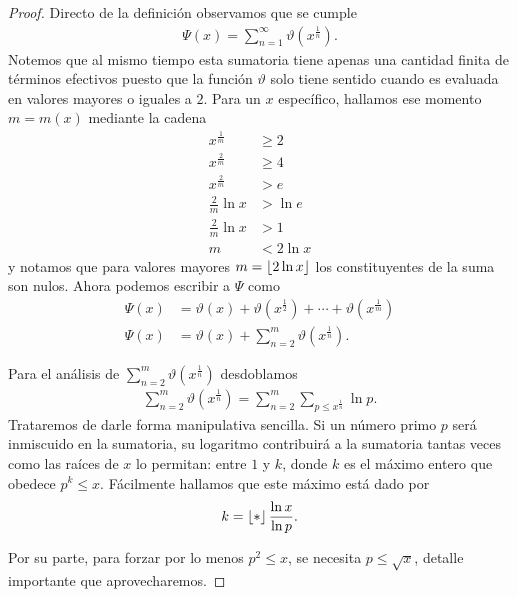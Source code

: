 \begin{proof}
Directo de la definici\'on observamos que se cumple 
\begin{align}
\Psi(x) = \sum_{n = 1}^\infty \vartheta(x^\frac{1}{n}).
\end{align}
Notemos que al mismo tiempo esta sumatoria tiene apenas una cantidad finita de t\'erminos efectivos puesto que la funci\'on $\vartheta$ 
solo tiene sentido cuando es evaluada en valores mayores o iguales a $2$. 
Para un $x$ espec\'ifico,  hallamos ese momento $m=m(x)$ mediante la cadena 
\begin{align}
x^\frac{1}{m} &\geq 2 \\
x^\frac{2}{m} &\geq 4 \\
x^\frac{2}{m} &> e \\
\frac{2}{m}\ln x &> \ln e \\
\frac{2}{m}\ln x &> 1 \\
m &< 2 \ln x
\end{align}
y notamos que para valores mayores $m = \left\lfloor 2 \ln x \right\rfloor$ los constituyentes de la suma son nulos.
Ahora podemos escribir a $\Psi$ como 
\begin{align}
\Psi(x) &= \vartheta(x) + \vartheta(x^\frac{1}{2}) + \cdots + \vartheta(x^\frac{1}{m}) \\
\Psi(x) &= \vartheta(x) + \sum_{n = 2}^m \vartheta(x^\frac{1}{n}).
\end{align}

Para el an\'alisis de $\sum_{n = 2}^m \vartheta(x^\frac{1}{n})$ desdoblamos 
\begin{align}
\sum_{n = 2}^m \vartheta(x^\frac{1}{n}) = \sum_{n = 2}^m \sum_{p \leq x^\frac{1}{n}} \ln p. 
\end{align}
Trataremos de darle forma manipulativa sencilla. 
Si un n\'umero primo $p$ ser\'a inmiscuido en la sumatoria, 
su logaritmo contribuir\'a a la sumatoria tantas veces como las ra\'ices de $x$ lo permitan: 
entre $1$ y $k$, donde $k$ es el m\'aximo entero que obedece $p^k \le x$.  
F\'acilmente hallamos que este m\'aximo est\'a dado por 
\begin{align}
k = \left\lfloor * \right\rfloor{\frac{\ln x}{\ln p}}.
\end{align}

Por su parte, para forzar por lo menos $p^2 \le x$, se necesita $p \le \sqrt{x}$,
detalle importante que aprovecharemos.


\end{proof}
